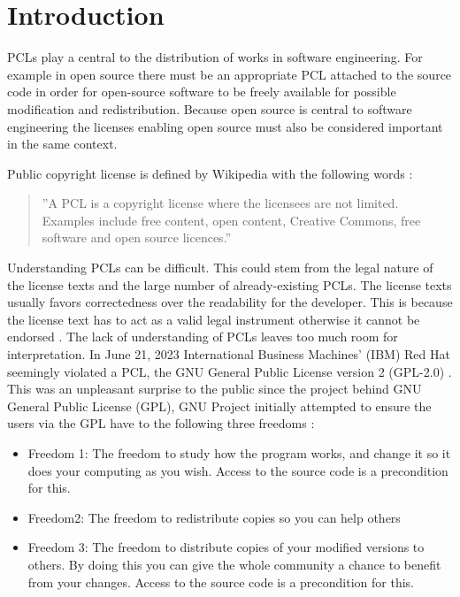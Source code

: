 \chapter{Introduction\label{intro}}

PCLs play a central to the distribution of works in software engineering. For example in open source there must be an appropriate PCL attached to the source code in order for open-source software to be freely available for possible modification and redistribution. Because open source is central to software engineering the licenses enabling open source must also be considered important in the same context.

Public copyright license is defined by Wikipedia with the following words \citep{wiki:publiclicenses}:
\begin{quote}
	''A PCL is a copyright license where the licensees are not limited. Examples include free content, open content, Creative Commons, free software and open source licences.''
\end{quote}

Understanding PCLs can be difficult. This could stem from the legal nature of the license texts and the large number of already-existing PCLs. The license texts usually favors correctedness over the readability for the developer. This is because the license text has to act as a valid legal instrument otherwise it cannot be endorsed \citep{ferguson2006gpl}. The lack of understanding of PCLs leaves too much room for interpretation. In June 21, 2023 International Business Machines' (IBM) Red Hat seemingly violated a PCL, the GNU General Public License version 2 (GPL-2.0) \citep{sfc:rhel} \citep{ibm:rhel}. This was an unpleasant surprise to the public since the project behind GNU General Public License (GPL), GNU Project initially attempted to ensure the users via the GPL have to the following three freedoms \citep{gnu:free}:
\begin{itemize}
	\item Freedom 1:	The freedom to study how the program works, and change it so it does your computing as you wish. Access to the source code is a precondition for this.
	\item Freedom2: The freedom to redistribute copies so you can help others
	\item Freedom 3:	The freedom to distribute copies of your modified versions to others. By doing this you can give the whole community a chance to benefit from your changes. Access to the source code is a precondition for this.
\end{itemize}

